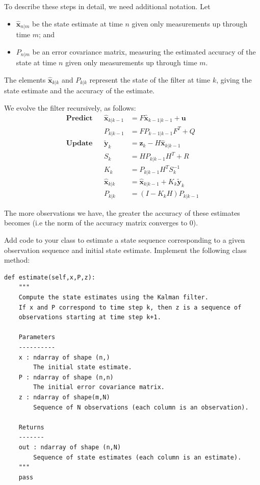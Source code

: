 To describe these steps in detail, we need additional notation. Let
\begin{itemize}
    \item $\widehat{\mathbf{x}}_{n|m}$ be the state estimate at time $n$ given only measurements up through time $m$; and
    \item $P_{n|m}$ be an error covariance matrix, measuring the estimated accuracy of the state at time $n$ given only measurements up through time $m$.
\end{itemize}

The elements $\widehat{\mathbf{x}}_{k|k}$ and $P_{k|k}$ represent the state of the filter at time $k$, giving the state estimate and the accuracy of the estimate.


We evolve the filter recursively, as follows:
\begin{align*}
\textbf{Predict} & & \widehat{\mathbf{x}}_{k|k-1} & = F\widehat{\mathbf{x}}_{k-1|k-1} + \mathbf{u} \\
 & & P_{k|k-1} & = FP_{k-1|k-1}F^{T} + Q \\
\textbf{Update} & & \tilde{\mathbf{y}}_{k} & = \mathbf{z}_{k} - H\widehat{\mathbf{x}}_{k|k-1} \\
 & & S_{k} & = HP_{k|k-1}H^{T} + R \\
 & & K_{k} & = P_{k|k-1}H^{T}S_{k}^{-1} \\
 & & \widehat{\mathbf{x}}_{k|k} & = \widehat{\mathbf{x}}_{k|k-1} + K_{k}\tilde{\mathbf{y}}_{k} \\
 & & P_{k|k} & = (I - K_{k}H)P_{k|k-1}
\end{align*}

The more observations we have, the greater the accuracy of these estimates becomes (i.e the norm of the accuracy matrix converges to $0$).

\begin{problem}
Add code to your  class to estimate a state sequence corresponding to a given observation sequence and initial state estimate.
Implement the following class method:
\begin{lstlisting}
def estimate(self,x,P,z):
    """
    Compute the state estimates using the Kalman filter.
    If x and P correspond to time step k, then z is a sequence of
    observations starting at time step k+1.

    Parameters
    ----------
    x : ndarray of shape (n,)
        The initial state estimate.
    P : ndarray of shape (n,n)
        The initial error covariance matrix.
    z : ndarray of shape(m,N)
        Sequence of N observations (each column is an observation).

    Returns
    -------
    out : ndarray of shape (n,N)
        Sequence of state estimates (each column is an estimate).
    """
    pass
\end{lstlisting}
\end{problem}

